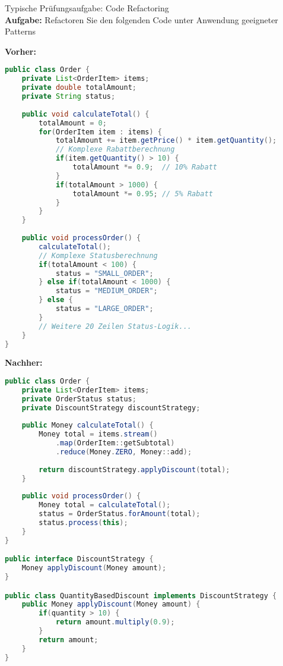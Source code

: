 \begin{example2}{Typische Prüfungsaufgabe: Code Refactoring}\\
\textbf{Aufgabe:} Refactoren Sie den folgenden Code unter Anwendung geeigneter Patterns

\textbf{Vorher:}
\begin{lstlisting}[language=Java, style=base]
public class Order {
    private List<OrderItem> items;
    private double totalAmount;
    private String status;
    
    public void calculateTotal() {
        totalAmount = 0;
        for(OrderItem item : items) {
            totalAmount += item.getPrice() * item.getQuantity();
            // Komplexe Rabattberechnung
            if(item.getQuantity() > 10) {
                totalAmount *= 0.9;  // 10% Rabatt
            }
            if(totalAmount > 1000) {
                totalAmount *= 0.95; // 5% Rabatt
            }
        }
    }
    
    public void processOrder() {
        calculateTotal();
        // Komplexe Statusberechnung
        if(totalAmount < 100) {
            status = "SMALL_ORDER";
        } else if(totalAmount < 1000) {
            status = "MEDIUM_ORDER";
        } else {
            status = "LARGE_ORDER";
        }
        // Weitere 20 Zeilen Status-Logik...
    }
}
\end{lstlisting}

\textbf{Nachher:}
\begin{lstlisting}[language=Java, style=base]
public class Order {
    private List<OrderItem> items;
    private OrderStatus status;
    private DiscountStrategy discountStrategy;
    
    public Money calculateTotal() {
        Money total = items.stream()
            .map(OrderItem::getSubtotal)
            .reduce(Money.ZERO, Money::add);
            
        return discountStrategy.applyDiscount(total);
    }
    
    public void processOrder() {
        Money total = calculateTotal();
        status = OrderStatus.forAmount(total);
        status.process(this);
    }
}

public interface DiscountStrategy {
    Money applyDiscount(Money amount);
}

public class QuantityBasedDiscount implements DiscountStrategy {
    public Money applyDiscount(Money amount) {
        if(quantity > 10) {
            return amount.multiply(0.9);
        }
        return amount;
    }
}


\end{lstlisting}
\end{example2}

